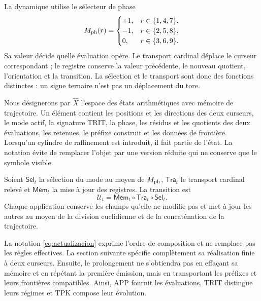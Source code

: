 La dynamique utilise le sélecteur de phase
\[
 M_{\rm ph}(r)=
 \begin{cases}
 +1,&r\in\{1,4,7\},\\
 -1,&r\in\{2,5,8\},\\
 0,&r\in\{3,6,9\}.
 \end{cases}
\]
Sa valeur décide quelle évaluation opère. Le transport cardinal déplace le curseur correspondant ; le registre conserve la valeur précédente, le nouveau quotient, l'orientation et la transition. La sélection et le transport sont donc des fonctions distinctes : un signe ternaire n'est pas un déplacement du tore.

Nous désignerons par \(\widehat X\) l'espace des états arithmétiques avec mémoire de trajectoire. Un élément contient les positions et les directions des deux curseurs, le mode actif, la signature TRIT, la phase, les résidus et les quotients des deux évaluations, les retenues, le préfixe construit et les données de frontière. Lorsqu'un cylindre de raffinement est introduit, il fait partie de l'état. La notation évite de remplacer l'objet par une version réduite qui ne conserve que le symbole visible.

\begin{definition}
Soient \(\mathsf{Sel}_t\) la sélection du mode au moyen de \(M_{\rm ph}\), \(\mathsf{Tra}_t\) le transport cardinal relevé et \(\mathsf{Mem}_t\) la mise à jour des registres. La transition est
\begin{equation}
 \mathcal U_t=\mathsf{Mem}_t\circ\mathsf{Tra}_t\circ\mathsf{Sel}_t.
 \label{eq:actualizacion}
\end{equation}
Chaque application conserve les champs qu'elle ne modifie pas et met à jour les autres au moyen de la division euclidienne et de la concaténation de la trajectoire.
\end{definition}

La notation \eqref{eq:actualizacion} exprime l'ordre de composition et ne remplace pas les règles effectives. La section suivante spécifie complètement sa réalisation finie à deux curseurs. Ensuite, le prolongement ne s'obtiendra pas en effaçant sa mémoire et en répétant la première émission, mais en transportant les préfixes et leurs frontières compatibles. Ainsi, APP fournit les évaluations, TRIT distingue leurs régimes et TPK compose leur évolution.




